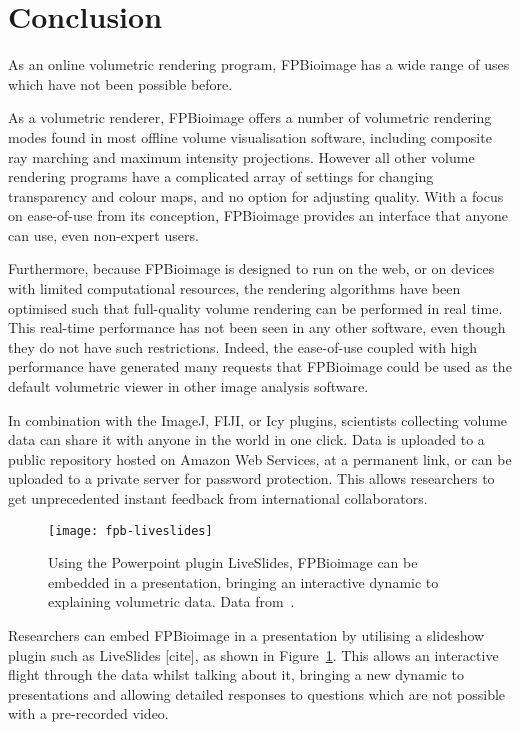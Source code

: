 

\section{Conclusion} %
As an online volumetric rendering program, FPBioimage has a wide range of uses which have not been possible before. 

As a volumetric renderer, FPBioimage offers a number of volumetric rendering modes found in most offline volume visualisation software, including composite ray marching and maximum intensity projections. 
However all other volume rendering programs have a complicated array of settings for changing transparency and colour maps, and no option for adjusting quality.
With a focus on ease-of-use from its conception, FPBioimage provides an interface that anyone can use, even non-expert users. 

Furthermore, because FPBioimage is designed to run on the web, or on devices with limited computational resources, the rendering algorithms have been optimised such that full-quality volume rendering can be performed in real time. 
This real-time performance has not been seen in any other software, even though they do not have such restrictions. 
Indeed, the ease-of-use coupled with high performance have generated many requests that FPBioimage could be used as the default volumetric viewer in other image analysis software. 

In combination with the ImageJ, FIJI, or Icy plugins, scientists collecting volume data can share it with anyone in the world in one click. 
Data is uploaded to a public repository hosted on Amazon Web Services, at a permanent link, or can be uploaded to a private server for password protection. 
This allows researchers to get unprecedented instant feedback from international collaborators. 

\begin{figure}[htbp!]
\centering
\texttt{[image: fpb-liveslides]}
\caption[FPBioimage: LiveSlides in Powerpoint brings interactive FPBioimage rendering to presentations]{Using the Powerpoint plugin LiveSlides, FPBioimage can be embedded in a presentation, bringing an interactive dynamic to explaining volumetric data. Data from~\cite{kumar2014dual}. } %
\label{fig:fpb-liveslides}
\end{figure}

Researchers can embed FPBioimage in a presentation by utilising a slideshow plugin such as LiveSlides [cite], as shown in Figure~\ref{fig:fpb-liveslides}. 
This allows an interactive flight through the data whilst talking about it, bringing a new dynamic to presentations and allowing detailed responses to questions which are not possible with a pre-recorded video. 

